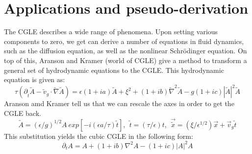 \documentclass[a4paper,12pt]{report}
\begin{document}
\section{Applications and pseudo-derivation}
The CGLE describes a wide range of phenomena. Upon setting various components to zero, we get can derive a number of equations in fluid dynamics, such as the diffusion equation, as well as the nonlinear Schr\"odinger equation. 
On top of this, Aranson and Kramer (world of CGLE) give a method to transform a general set of hydrodynamic equations to the CGLE. This hydrodynamic equation is given as:
$$\tau (\partial_{\tilde t}\tilde A-\tilde v_g\cdot \tilde\nabla \tilde A)=\epsilon(1+ia)\tilde A+\xi^2+(1+ib)\tilde\nabla^2 \tilde A-g(1+ic)|\tilde A|^2 \tilde A$$ 
Aranson amd Kramer tell us that we can rescale the axes in order to get the CGLE back. 
$$\tilde A=(\epsilon/g)^{1/2} A \ exp[-i (\epsilon a/\tau)\tilde t], \ \ \tilde t = (\tau/\epsilon)t, \ \ \vec {\tilde x} = (\xi/\epsilon^{1/2})\vec x+\vec v_g \tilde t$$
This substitution yields the cubic CGLE in the following form:
$$\partial_t A=A+(1+ib)\nabla^2A-(1+ic)|A|^2A$$
\end{document}
